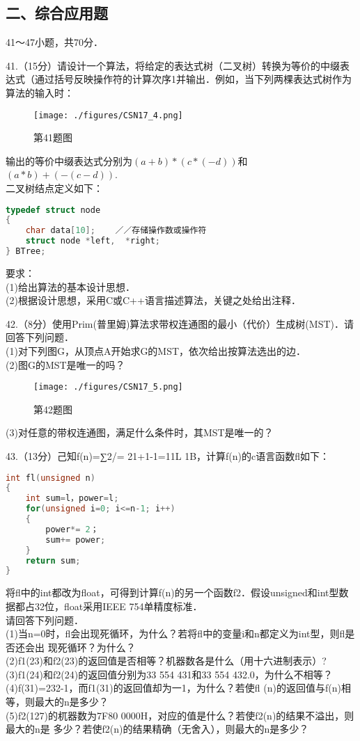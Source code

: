 \subsection{二、综合应用题}
41～47小题，共70分．

41.（15分）请设计一个算法，将给定的表达式树（二叉树）转换为等价的中缀表达式（通过括号反映操作符的计算次序1并输出．例如，当下列两棵表达式树作为算法的输入时：
\begin{figure}[ht]
\centering
\texttt{[image: ./figures/CSN17\_4.png]}
\caption{第41题图} \label{CSN17_fig4}
\end{figure}
输出的等价中缀表达式分别为$(a+b)*(c*(-d))$和$(a*b)+(-(c-d))$. \\
二叉树结点定义如下：
\begin{lstlisting}[language=cpp]
typedef struct node
{
    char data[10];    ／／存储操作数或操作符
    struct node *left,  *right;
} BTree;
\end{lstlisting}
要求： \\
(1)给出算法的基本设计思想． \\
(2)根据设计思想，采用C或C++语言描述算法，关键之处给出注释．

42.（8分）使用Prim(普里姆)算法求带权连通图的最小（代价）生成树(MST)．请回答下列问题． \\
(1)对下列图G，从顶点A开始求G的MST，依次给出按算法选出的边． \\
(2)图G的MST是唯一的吗？
\begin{figure}[ht]
\centering
\texttt{[image: ./figures/CSN17\_5.png]}
\caption{第42题图} \label{CSN17_fig5}
\end{figure}
(3)对任意的带权连通图，满足什么条件时，其MST是唯一的？

43.（13分）己知f(n)=∑2/= 21+1-1=11L 1B，计算f(n)的c语言函数fl如下： \\
\begin{lstlisting}[language=cpp]
int fl(unsigned n)
{
    int sum=l，power=l;
    for(unsigned i=0; i<=n-1; i++)
    {
        power*= 2；
        sum+= power;
    }
    return sum;
}
\end{lstlisting}
将fl中的int都改为float，可得到计算f(n)的另一个函数f2．假设unsigned和int型数据都占32位，float采用IEEE 754单精度标准． \\
请回答下列问题． \\
    (1)当n=0时，fl会出现死循环，为什么？若将fl中的变量i和n都定义为int型，则fl是否还会出
现死循环？为什么？ \\
    (2)f1(23)和f2(23)的返回值是否相等？机器数各是什么（用十六进制表示）? \\
    (3)f1(24)和f2(24)的返回值分别为33 554 431和33 554 432.0，为什么不相等？ \\
    (4)f(31)=232-1，而f1(31)的返回值却为一1，为什么？若使fl (n)的返回值与f(n)相等，则最大的n是多少？ \\
    (5)f2(127)的杌器数为7F80 0000H，对应的值是什么？若使f2(n)的结果不溢出，则最大的n是
多少？若使f2(n)的结果精确（无舍入），则最大的n是多少？


